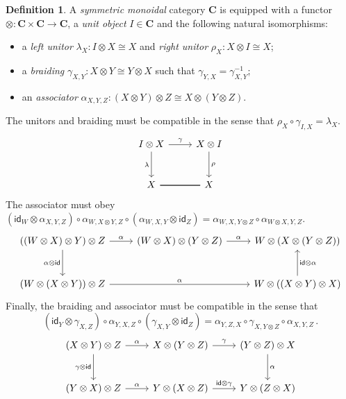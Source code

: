 \documentclass[11pt,oneside,draft]{book}
\theoremstyle{definition}
\newtheorem{definition}[theorem]{Definition}
\newcommand{\kw}[1]{\ensuremath{ \mathsf{#1} }}
\begin{document}
\begin{definition}
A \emph{symmetric monoidal} category $\mathbf{C}$
is equipped with a functor
${\otimes} : \mathbf{C} \times \mathbf{C} \rightarrow \mathbf{C}$,
a \emph{unit object} $I \in \mathbf{C}$
and the following natural isomorphisms:
\begin{itemize}
  \item a \emph{left unitor} $\lambda_X : I \otimes X \cong X$ and
          \emph{right unitor} $\rho_X : X \otimes I \cong X$;
  \item a \emph{braiding} $\gamma_{X,Y} : X \otimes Y \cong Y \otimes X$
    such that $\gamma_{Y,X} = \gamma_{X,Y}^{-1}$;
  \item an \emph{associator}
    $\alpha_{X,Y,Z} : (X \otimes Y) \otimes Z \cong X \otimes (Y \otimes Z)$.
\end{itemize}
The unitors and braiding must be compatible in the
sense that $\rho_X \circ \gamma_{I, X} = \lambda_X$.
\[
  \begin{tikzcd}[row sep=large]
    I \otimes X \ar[d, "\lambda"'] \ar[r, "\gamma"] &
    X \otimes I \ar[d, "\rho"] \\
    X \ar[r, dash, double] &
    X
  \end{tikzcd}
\]
The associator must obey
$(\kw{id}_W \otimes \alpha_{X,Y,Z}) \circ
 \alpha_{W, X \otimes Y, Z} \circ
 (\alpha_{W,X,Y} \otimes \kw{id}_Z) =
 \alpha_{W, X, Y \otimes Z} \circ
 \alpha_{W \otimes X, Y, Z}$.
\[
  \begin{tikzcd}[row sep=large]
    ((W \otimes X) \otimes Y) \otimes Z
      \ar[r, "\alpha"]
      \ar[d, "\alpha \otimes \kw{id}"']
    &
    (W \otimes X) \otimes (Y \otimes Z)
      \ar[r, "\alpha"]
    &
    W \otimes (X \otimes (Y \otimes Z))
    \\
    (W \otimes (X \otimes Y)) \otimes Z
      \ar[rr, "\alpha"]
    & &
    W \otimes ((X \otimes Y) \otimes X)
      \ar[u, "\kw{id} \otimes \alpha"']
  \end{tikzcd}
\]
Finally,
the braiding and associator must be compatible
in the sense that
\[
  (\kw{id}_Y \otimes \gamma_{X,Z}) \circ
  \alpha_{Y,X,Z} \circ
  (\gamma_{X,Y} \otimes \kw{id}_Z) =
  \alpha_{Y,Z,X} \circ \gamma_{X,Y \otimes Z} \circ \alpha_{X,Y,Z}
  \,.
\]
\[
  \begin{tikzcd}[row sep=large]
    (X \otimes Y) \otimes Z
      \ar[r, "\alpha"]
      \ar[d, "\gamma \otimes \kw{id}"']
    &
    X \otimes (Y \otimes Z)
      \ar[r, "\gamma"]
    &
    (Y \otimes Z) \otimes X
      \ar[d, "\alpha"]
    \\
    (Y \otimes X) \otimes Z
      \ar[r, "\alpha"]
    &
    Y \otimes (X \otimes Z)
      \ar[r, "\kw{id} \otimes \gamma"]
    &
    Y \otimes (Z \otimes X)
  \end{tikzcd}
\]
\end{definition}
\end{document}
